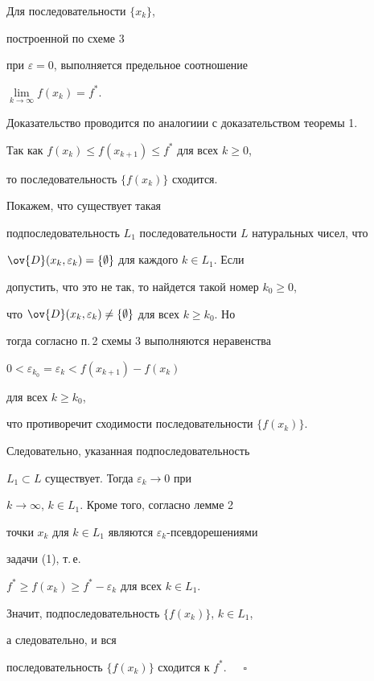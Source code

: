 \begin{thm}


Для последовательности $\{x_k\}$,


построенной по схеме $3$


при $\varepsilon=0$, выполняется предельное соотношение


$\lim\limits_{k\to\infty} f(x_k)=f^*$.


\end{thm}





Доказательство проводится по аналогиии с доказательством теоремы 1.


Так как $f(x_k)\le f(x_{k+1})\le f^*$ для всех $k\ge0$, 


то последовательность $\{f(x_k)\}$ сходится. 


Покажем, что существует такая


подпоследовательность $L_1$ последовательности $L$ натуральных чисел, что


$\ov{D}(x_k,\varepsilon_k)=\{\emptyset\}$ для каждого $k\in L_1$. Если


допустить, что это не так, то найдется такой номер $k_0\ge0$,


что $\ov{D}(x_k,\varepsilon_k)\ne\{\emptyset\}$ для всех $k\ge k_0$. Но


тогда согласно п.\,2 схемы 3 выполняются неравенства


$0<\varepsilon_{k_0}=\varepsilon_k<f(x_{k+1})-f(x_k)$


для всех $k\ge k_0$,


что противоречит сходимости последовательности $\{f(x_k)\}$.


Следовательно, указанная подпоследовательность


$L_1\subset L$ существует. Тогда $\varepsilon_k\rightarrow0$ при


$k\rightarrow\infty$, $k\in L_1$. Кроме того, согласно лемме 2


точки $x_k$ для $k\in L_1$ являются $\varepsilon_k$-псевдорешениями


задачи (1), т.\,е.


$f^*\ge f(x_k)\ge f^*-\varepsilon_k$ для всех $k\in L_1$.


Значит, подпоследовательность $\{f(x_k)\}$, $k\in L_1$,


а следовательно, и вся


последовательность $\{f(x_k)\}$ сходится к $f^*$.~$\quad\square$


